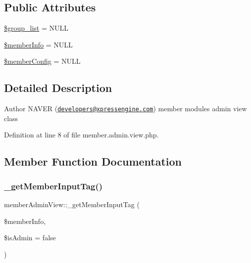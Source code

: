 \subsection*{Public Attributes}
\begin{DoxyCompactItemize}
\item 
\hyperlink{classmemberAdminView_a900a93ad7807c2f056b5055cf33f6be6}{\$group\+\_\+list} = N\+U\+LL
\item 
\hyperlink{classmemberAdminView_a4955a7b9bc128c344a2987dd1cb8e043}{\$member\+Info} = N\+U\+LL
\item 
\hyperlink{classmemberAdminView_acd19132e0c8fd313edebad04734206f9}{\$member\+Config} = N\+U\+LL
\end{DoxyCompactItemize}


\subsection{Detailed Description}
\begin{DoxyAuthor}{Author}
N\+A\+V\+ER (\href{mailto:developers@xpressengine.com}{\tt developers@xpressengine.\+com}) member module\textquotesingle{}s admin view class 
\end{DoxyAuthor}


Definition at line 8 of file member.\+admin.\+view.\+php.



\subsection{Member Function Documentation}
\mbox{\label{classmemberAdminView_a49f5bc2cf86576c040abfb686c21383b}} 
\subsubsection{\texorpdfstring{\+\_\+get\+Member\+Input\+Tag()}{\_getMemberInputTag()}}
{\footnotesize\ttfamily member\+Admin\+View\+::\+\_\+get\+Member\+Input\+Tag (\begin{DoxyParamCaption}\item[{}]{\$member\+Info,  }\item[{}]{\$is\+Admin = {\ttfamily false} }\end{DoxyParamCaption})}

